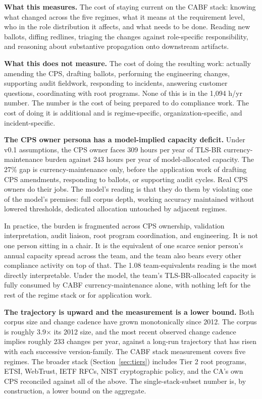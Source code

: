 \documentclass[11pt,letterpaper]{article}
\begin{document}
\textbf{What this measures.} The cost of staying current on the CABF stack: knowing what changed across the five regimes, what it means at the requirement level, who in the role distribution it affects, and what needs to be done. Reading new ballots, diffing redlines, triaging the changes against role-specific responsibility, and reasoning about substantive propagation onto downstream artifacts.

\textbf{What this does not measure.} The cost of doing the resulting work: actually amending the CPS, drafting ballots, performing the engineering changes, supporting audit fieldwork, responding to incidents, answering customer questions, coordinating with root programs. None of this is in the 1{,}094 h/yr number. The number is the cost of being prepared to do compliance work. The cost of doing it is additional and is regime-specific, organization-specific, and incident-specific.

\textbf{The CPS owner persona has a model-implied capacity deficit.} Under v0.1 assumptions, the CPS owner faces 309 hours per year of TLS-BR currency-maintenance burden against 243 hours per year of model-allocated capacity. The 27\% gap is currency-maintenance only, before the application work of drafting CPS amendments, responding to ballots, or supporting audit cycles. Real CPS owners do their jobs. The model's reading is that they do them by violating one of the model's premises: full corpus depth, working accuracy maintained without lowered thresholds, dedicated allocation untouched by adjacent regimes.

In practice, the burden is fragmented across CPS ownership, validation interpretation, audit liaison, root program coordination, and engineering. It is not one person sitting in a chair. It is the equivalent of one scarce senior person's annual capacity spread across the team, and the team also bears every other compliance activity on top of that. The 1.08 team-equivalents reading is the most directly interpretable. Under the model, the team's TLS-BR-allocated capacity is fully consumed by CABF currency-maintenance alone, with nothing left for the rest of the regime stack or for application work.

\textbf{The trajectory is upward and the measurement is a lower bound.} Both corpus size and change cadence have grown monotonically since 2012. The corpus is roughly 3.9$\times$ its 2012 size, and the most recent observed change cadence implies roughly 233 changes per year, against a long-run trajectory that has risen with each successive version-family. The CABF stack measurement covers five regimes. The broader stack (Section~\ref{sec:tiers}) includes Tier 2 root programs, ETSI, WebTrust, IETF RFCs, NIST cryptographic policy, and the CA's own CPS reconciled against all of the above. The single-stack-subset number is, by construction, a lower bound on the aggregate.
\end{document}
